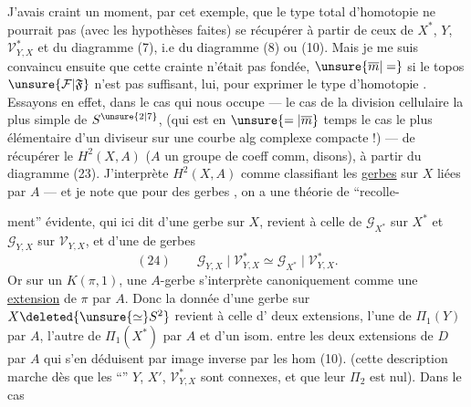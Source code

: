 J'avais craint un moment, par cet exemple,
que le type total d'homotopie  ne pourrait
pas (avec les hypothèses  faites) se récupérer
à partir de ceux de $X^*$, $Y$, $\mathcal V^*_{Y,X}$ et du
diagramme (7), i.e du diagramme (8)
ou (10). Mais je me suis convaincu ensuite
que cette crainte n'était pas fondée, $\unsure{\overline m|=}$ si
le topos $\unsure{\mathcal F|\mathfrak F}$ n'est pas suffisant, lui, pour
exprimer le type d'homotopie .
Essayons en effet, dans le cas qui nous
occupe --- le cas de la division cellulaire
la plus simple de $S^{\unsure{2|7}}$, (qui est en $\unsure{=|\overline m}$ temps
le cas le plus  élémentaire d'un
diviseur sur une courbe alg complexe
compacte !) --- de récupérer le $H^2(X,A)$
($A$ un groupe de coeff comm, disons),
à partir du diagramme (23). J'interprète
$H^2(X,A)$ comme classifiant les \uline{gerbes} sur
$X$ liées par $A$ --- et je note que pour des
 gerbes , on a une théorie de ``recolle-

ment'' évidente, qui ici dit 
d'une gerbe 
sur $X$, revient à celle de  $\mathcal G_{X^*}$ sur
$X^*$ et $\mathcal G_{Y,X}$ sur $\mathcal V_{Y,X}$, et d'une
 de  gerbes
\[
(24)\qquad \mathcal G_{Y,X}\mid\mathcal V^*_{Y,X}\simeq
\mathcal G_{X^*}\mid\mathcal V^*_{Y,X}.
\]
Or sur un $K(\pi,1)$, une $A$-gerbe
s'interprète canoniquement comme une
\uline{extension} de $\pi$ par $A$. Donc la donnée
d'une gerbe sur $X\deleted{{}\unsure{\simeq} S^2}$\unsure{,} revient à celle
d' deux extensions, l'une de
$\Pi_1(Y)$ par $A$, l'autre de $\Pi_1(X^*)$ par $A$
et d'un isom. entre les deux extensions
de $D$ par $A$ qui s'en déduisent\unsure{,}
par image inverse par les hom (10).
(cette description marche dès que les
``'' $Y$, $X'$, $\mathcal V^*_{Y,X}$ sont connexes, et
que leur $\Pi_2$ est nul). Dans le cas

